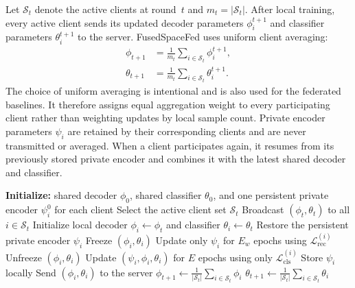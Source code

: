 \documentclass[twoside]{article}
\theoremstyle{thmstyleone}%
\theoremstyle{thmstyletwo}%
\theoremstyle{thmstylethree}%
\begin{document}
Let $\mathcal{S}_t$ denote the active clients at round~$t$ and
$m_t=|\mathcal{S}_t|$. After local training, every active client sends its
updated decoder parameters $\phi_i^{t+1}$ and classifier parameters
$\theta_i^{t+1}$ to the server. FusedSpaceFed uses uniform client averaging:
\begin{align}
\phi_{t+1}
&=
\frac{1}{m_t}
\sum_{i\in\mathcal{S}_t}\phi_i^{t+1},
\label{eq:agg_dec}\\
\theta_{t+1}
&=
\frac{1}{m_t}
\sum_{i\in\mathcal{S}_t}\theta_i^{t+1}.
\label{eq:agg_cls}
\end{align}
The choice of uniform averaging is intentional and is also used for the
federated baselines. It therefore assigns equal aggregation weight to every
participating client rather than weighting updates by local sample count.
Private encoder parameters $\psi_i$ are retained by their corresponding
clients and are never transmitted or averaged. When a client participates
again, it resumes from its previously stored private encoder and combines it
with the latest shared decoder and classifier.

\begin{algorithm}[H]
\caption{FusedSpaceFed training protocol}
\label{alg:fusedspacefed}
\begin{algorithmic}[1]
\State \textbf{Initialize:} shared decoder $\phi_0$, shared classifier
$\theta_0$, and one persistent private encoder $\psi_i^0$ for each client
    \State Select the active client set $\mathcal{S}_t$
    \State Broadcast $(\phi_t,\theta_t)$ to all $i\in\mathcal{S}_t$
        \State Initialize local decoder $\phi_i\gets\phi_t$ and classifier
        $\theta_i\gets\theta_t$
        \State Restore the persistent private encoder $\psi_i$
        \State Freeze $(\phi_i,\theta_i)$
        \State Update only $\psi_i$ for $E_w$ epochs using
        $\mathcal{L}_{\mathrm{rec}}^{(i)}$
        \State Unfreeze $(\phi_i,\theta_i)$
        \State Update $(\psi_i,\phi_i,\theta_i)$ for $E$ epochs using only
        $\mathcal{L}_{\mathrm{cls}}^{(i)}$
        \State Store $\psi_i$ locally
        \State Send $(\phi_i,\theta_i)$ to the server
    \EndFor
    \State $\displaystyle
    \phi_{t+1}\gets\frac{1}{|\mathcal{S}_t|}
    \sum_{i\in\mathcal{S}_t}\phi_i$
    \State $\displaystyle
    \theta_{t+1}\gets\frac{1}{|\mathcal{S}_t|}
    \sum_{i\in\mathcal{S}_t}\theta_i$
\EndFor
\end{algorithmic}
\end{algorithm}
\end{document}
